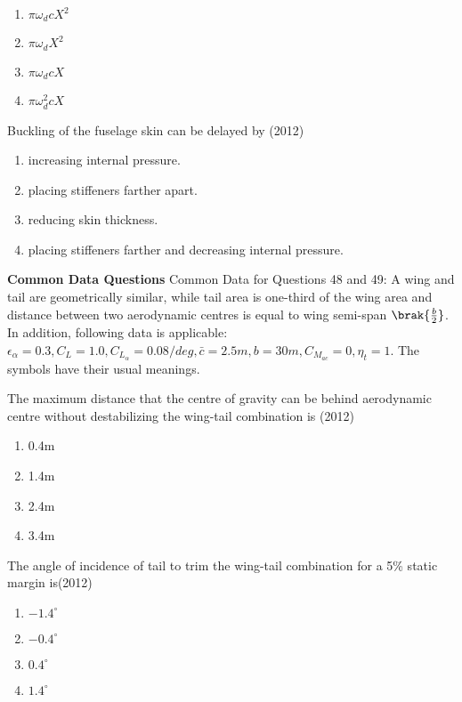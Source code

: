     \begin{enumerate}[label=(\Alph*)]
        \item $\pi\omega_dcX^2$
        \item $\pi\omega_dX^2$
        \item $\pi\omega_dcX$
        \item $\pi\omega_d^2cX$
    \end{enumerate}
    \item[47.] Buckling of the fuselage skin can be delayed by \hfill (2012)
    \begin{enumerate}[label=(\Alph*)]
        \item  increasing internal pressure. 
        \item placing stiffeners farther apart. 
        \item  reducing skin thickness. 
        \item  placing stiffeners farther and decreasing internal pressure. 
    \end{enumerate} 
    \textbf{Common Data Questions}
    Common Data for Questions 48 and 49:
    A wing and tail are geometrically similar, while tail area is one-third of the wing area and distance between
two aerodynamic centres is equal to wing semi-span $\brak{\frac{b}{2}}$. In addition, following data is applicable: 
$\epsilon_{\alpha}=0.3,C_L = 1.0,C_{L_{\alpha}} = 0.08/deg, \bar{c}=2.5m, b=30m,C_{M_{ac}}=0, \eta_t = 1$. The symbols have their usual meanings.
    \item The maximum distance that the centre of gravity can be behind aerodynamic centre without
    destabilizing the wing-tail combination is     \hfill (2012)
    \begin{enumerate}[label=(\Alph*)]
        \item 0.4m
        \item 1.4m
        \item 2.4m
        \item 3.4m
    \end{enumerate}
    \item The angle of incidence of tail to trim the wing-tail combination for a 5\% static margin is\hfill (2012) 
     \begin{enumerate}[label=(\Alph*)]
        \item $-1.4^{\circ}$
        \item $-0.4^{\circ}$
        \item $0.4^{\circ}$
        \item $1.4^{\circ}$
     \end{enumerate}
